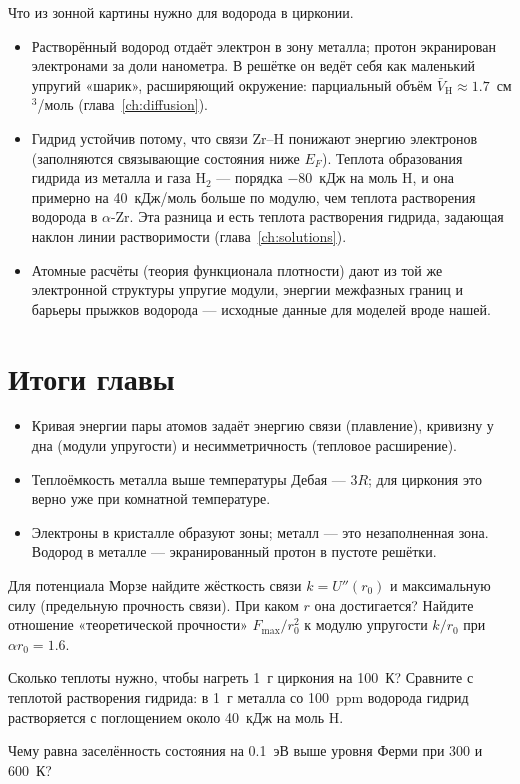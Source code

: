 
\begin{zrbox}
Что из зонной картины нужно для водорода в цирконии.
\begin{itemize}
\item Растворённый водород отдаёт электрон в зону металла; протон экранирован электронами за доли нанометра. В
  решётке он ведёт себя как маленький упругий «шарик», расширяющий окружение: парциальный объём
  $\bar V_{\mathrm H}\approx1.7$~см$^3$/моль (глава~\ref{ch:diffusion}).
\item Гидрид устойчив потому, что связи Zr--H понижают энергию электронов (заполняются связывающие состояния
  ниже $E_F$). Теплота образования гидрида из металла и газа H$_2$ --- порядка $-80$~кДж на моль H, и она примерно
  на 40~кДж/моль больше по модулю, чем теплота растворения водорода в $\alpha$-Zr. Эта разница и есть теплота
  растворения гидрида, задающая наклон линии растворимости (глава~\ref{ch:solutions}).
\item Атомные расчёты (теория функционала плотности) дают из той же электронной структуры упругие модули,
  энергии межфазных границ и барьеры прыжков водорода --- исходные данные для моделей вроде нашей.
\end{itemize}
\end{zrbox}

\section{Итоги главы}

\begin{itemize}
\item Кривая энергии пары атомов задаёт энергию связи (плавление), кривизну у дна (модули упругости) и
  несимметричность (тепловое расширение).
\item Теплоёмкость металла выше температуры Дебая --- $3R$; для циркония это верно уже при комнатной температуре.
\item Электроны в кристалле образуют зоны; металл --- это незаполненная зона. Водород в металле --- экранированный
  протон в пустоте решётки.
\end{itemize}

\begin{exercise}
Для потенциала Морзе найдите жёсткость связи $k = U''(r_0)$ и максимальную силу (предельную прочность связи).
При каком $r$ она достигается? Найдите отношение «теоретической прочности» $F_{\max}/r_0^2$ к модулю упругости
$k/r_0$ при $\alpha r_0 = 1.6$.
\end{exercise}

\begin{exercise}
Сколько теплоты нужно, чтобы нагреть 1~г циркония на 100~К? Сравните с теплотой растворения гидрида: в 1~г
металла со 100~ppm водорода гидрид растворяется с поглощением около 40~кДж на моль H.
\end{exercise}

\begin{exercise}
Чему равна заселённость состояния на 0.1~эВ выше уровня Ферми при 300 и 600~К?
\end{exercise}
